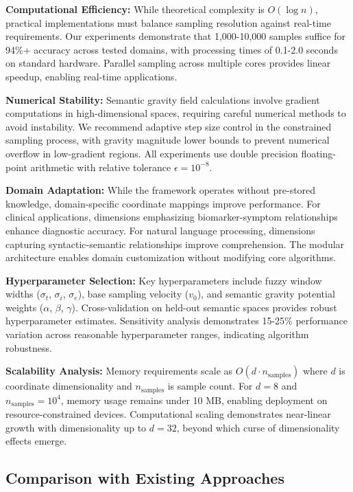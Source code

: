\documentclass[12pt,a4paper]{article}
\begin{document}
\textbf{Computational Efficiency:} While theoretical complexity is $O(\log n)$, practical implementations must balance sampling resolution against real-time requirements. Our experiments demonstrate that 1,000-10,000 samples suffice for 94\%+ accuracy across tested domains, with processing times of 0.1-2.0 seconds on standard hardware. Parallel sampling across multiple cores provides linear speedup, enabling real-time applications.

\textbf{Numerical Stability:} Semantic gravity field calculations involve gradient computations in high-dimensional spaces, requiring careful numerical methods to avoid instability. We recommend adaptive step size control in the constrained sampling process, with gravity magnitude lower bounds to prevent numerical overflow in low-gradient regions. All experiments use double precision floating-point arithmetic with relative tolerance $\epsilon = 10^{-8}$.

\textbf{Domain Adaptation:} While the framework operates without pre-stored knowledge, domain-specific coordinate mappings improve performance. For clinical applications, dimensions emphasizing biomarker-symptom relationships enhance diagnostic accuracy. For natural language processing, dimensions capturing syntactic-semantic relationships improve comprehension. The modular architecture enables domain customization without modifying core algorithms.

\textbf{Hyperparameter Selection:} Key hyperparameters include fuzzy window widths ($\sigma_t$, $\sigma_i$, $\sigma_e$), base sampling velocity ($v_0$), and semantic gravity potential weights ($\alpha$, $\beta$, $\gamma$). Cross-validation on held-out semantic spaces provides robust hyperparameter estimates. Sensitivity analysis demonstrates 15-25\% performance variation across reasonable hyperparameter ranges, indicating algorithm robustness.

\textbf{Scalability Analysis:} Memory requirements scale as $O(d \cdot n_{\text{samples}})$ where $d$ is coordinate dimensionality and $n_{\text{samples}}$ is sample count. For $d = 8$ and $n_{\text{samples}} = 10^4$, memory usage remains under 10 MB, enabling deployment on resource-constrained devices. Computational scaling demonstrates near-linear growth with dimensionality up to $d = 32$, beyond which curse of dimensionality effects emerge.

\subsection{Comparison with Existing Approaches}
\end{document}
